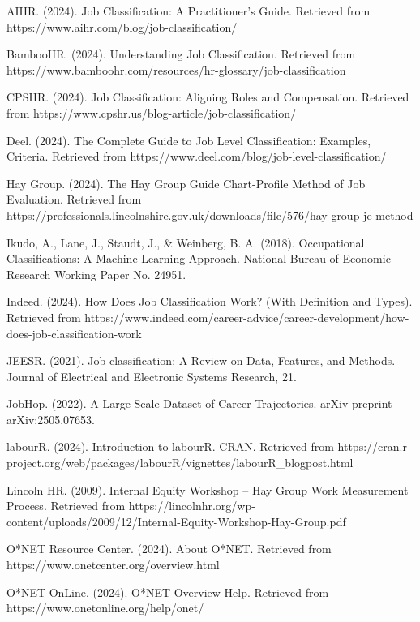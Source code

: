 \documentclass[../main.tex]{subfiles}
\begin{document}
\begin{thebibliography}{99}

AIHR. (2024). Job Classification: A Practitioner's Guide. Retrieved from https://www.aihr.com/blog/job-classification/

BambooHR. (2024). Understanding Job Classification. Retrieved from https://www.bamboohr.com/resources/hr-glossary/job-classification

CPSHR. (2024). Job Classification: Aligning Roles and Compensation. Retrieved from https://www.cpshr.us/blog-article/job-classification/

Deel. (2024). The Complete Guide to Job Level Classification: Examples, Criteria. Retrieved from https://www.deel.com/blog/job-level-classification/

Hay Group. (2024). The Hay Group Guide Chart-Profile Method of Job Evaluation. Retrieved from https://professionals.lincolnshire.gov.uk/downloads/file/576/hay-group-je-method

Ikudo, A., Lane, J., Staudt, J., \& Weinberg, B. A. (2018). Occupational Classifications: A Machine Learning Approach. National Bureau of Economic Research Working Paper No. 24951.

Indeed. (2024). How Does Job Classification Work? (With Definition and Types). Retrieved from https://www.indeed.com/career-advice/career-development/how-does-job-classification-work

JEESR. (2021). Job classification: A Review on Data, Features, and Methods. Journal of Electrical and Electronic Systems Research, 21.

JobHop. (2022). A Large-Scale Dataset of Career Trajectories. arXiv preprint arXiv:2505.07653.

labourR. (2024). Introduction to labourR. CRAN. Retrieved from https://cran.r-project.org/web/packages/labourR/vignettes/labourR\_blogpost.html

Lincoln HR. (2009). Internal Equity Workshop – Hay Group Work Measurement Process. Retrieved from https://lincolnhr.org/wp-content/uploads/2009/12/Internal-Equity-Workshop-Hay-Group.pdf

O*NET Resource Center. (2024). About O*NET. Retrieved from https://www.onetcenter.org/overview.html

O*NET OnLine. (2024). O*NET Overview Help. Retrieved from https://www.onetonline.org/help/onet/


\end{thebibliography}
\end{document}
